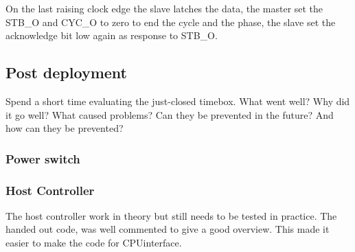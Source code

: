 On the last raising clock edge the slave latches the data, the master set the STB\_O and CYC\_O to zero to end the cycle and the phase, the slave set the acknowledge bit low again as response to STB\_O.

\subsection{Post deployment}
Spend a short time evaluating the just-closed timebox. What went well? Why did it go well? What caused problems? Can they be prevented in the future? And how can they be prevented?
\subsubsection{Power switch}
\subsubsection{Host Controller}
The host controller work in theory but still needs to be tested in practice. The handed out code, was well commented to give a good overview. This made it easier to make the code for CPUinterface.
